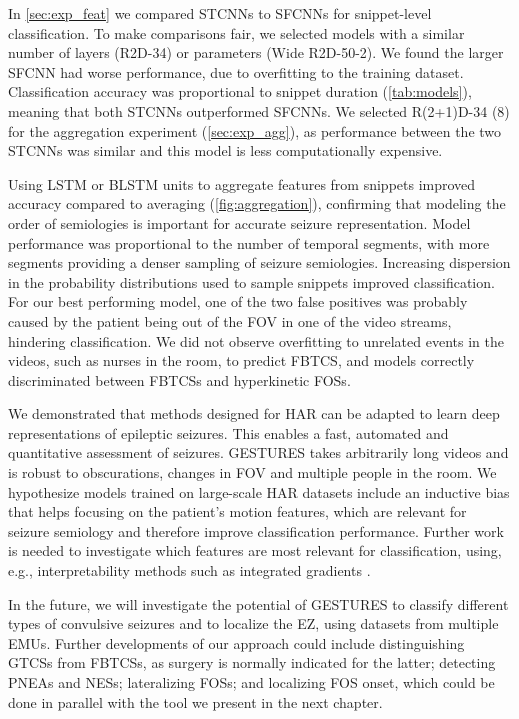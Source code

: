 In \cref{sec:exp_feat} we compared \acp{STCNN} to \acp{SFCNN} for snippet-level classification.
To make comparisons fair, we selected models with a similar number of layers (R2D-34) or parameters (Wide R2D-50-2).
We found the larger \ac{SFCNN} had worse performance, due to overfitting to the training dataset.
Classification accuracy was proportional to snippet duration (\cref{tab:models}), meaning that both \acp{STCNN} outperformed \acp{SFCNN}.
We selected R(2+1)D-34 (8) for the aggregation experiment (\cref{sec:exp_agg}), as performance between the two \acp{STCNN} was similar and this model is less computationally expensive.

Using \ac{LSTM} or \ac{BLSTM} units to aggregate features from snippets improved accuracy compared to averaging (\cref{fig:aggregation}), confirming that modeling the order of semiologies is important for accurate seizure representation.
Model performance was proportional to the number of temporal segments, with more segments providing a denser sampling of seizure semiologies. %
Increasing dispersion in the probability distributions used to sample snippets improved classification.
For our best performing model, one of the two false positives was probably caused by the patient being out of the \ac{FOV} in one of the video streams, hindering classification.
We did not observe overfitting to unrelated events in the videos, such as nurses in the room, to predict \ac{FBTCS}, and models correctly discriminated between \acp{FBTCS} and hyperkinetic \acp{FOS}.

We demonstrated that methods designed for \ac{HAR} can be adapted to learn deep representations of epileptic seizures.
This enables a fast, automated and quantitative assessment of seizures.
\Ac{GESTURES} takes arbitrarily long videos and is robust to obscurations, changes in \ac{FOV} and multiple people in the room.
We hypothesize models trained on large-scale \ac{HAR} datasets include an inductive bias that helps focusing on the patient's motion features, which are relevant for seizure semiology and therefore improve classification performance.
Further work is needed to investigate which features are most relevant for classification, using, e.g., interpretability methods such as integrated gradients \cite{sundararajan_axiomatic_2017}.

In the future, we will investigate the potential of \ac{GESTURES} to classify different types of convulsive seizures and to localize the \ac{EZ}, using datasets from multiple \acp{EMU}.
Further developments of our approach could include
distinguishing \acp{GTCS} from \acp{FBTCS}, as surgery is normally indicated for the latter;
detecting \acp{PNEA} and \acp{NES};
lateralizing \acp{FOS};
and localizing \ac{FOS} onset, which could be done in parallel with the tool we present in the next chapter.
